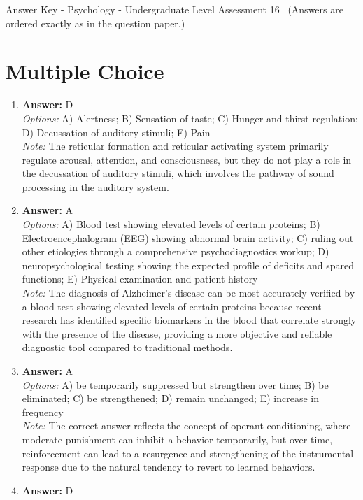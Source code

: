 \documentclass[12pt]{article}
\begin{document}
\begin{center}
Answer Key - Psychology - Undergraduate Level Assessment 16 \
\small (Answers are ordered exactly as in the question paper.)
\end{center}

\section*{Multiple Choice}
\begin{enumerate}[label=\arabic*.]
\item \textbf{Answer:} D
\\ \textit{Options:} A) Alertness; B) Sensation of taste; C) Hunger and thirst regulation; D) Decussation of auditory stimuli; E) Pain
\\ \textit{Note:} The reticular formation and reticular activating system primarily regulate arousal, attention, and consciousness, but they do not play a role in the decussation of auditory stimuli, which involves the pathway of sound processing in the auditory system.
\item \textbf{Answer:} A
\\ \textit{Options:} A) Blood test showing elevated levels of certain proteins; B) Electroencephalogram (EEG) showing abnormal brain activity; C) ruling out other etiologies through a comprehensive psychodiagnostics workup; D) neuropsychological testing showing the expected profile of deficits and spared functions; E) Physical examination and patient history
\\ \textit{Note:} The diagnosis of Alzheimer's disease can be most accurately verified by a blood test showing elevated levels of certain proteins because recent research has identified specific biomarkers in the blood that correlate strongly with the presence of the disease, providing a more objective and reliable diagnostic tool compared to traditional methods.
\item \textbf{Answer:} A
\\ \textit{Options:} A) be temporarily suppressed but strengthen over time; B) be eliminated; C) be strengthened; D) remain unchanged; E) increase in frequency
\\ \textit{Note:} The correct answer reflects the concept of operant conditioning, where moderate punishment can inhibit a behavior temporarily, but over time, reinforcement can lead to a resurgence and strengthening of the instrumental response due to the natural tendency to revert to learned behaviors.
\item \textbf{Answer:} D

\end{enumerate}
\end{document}
